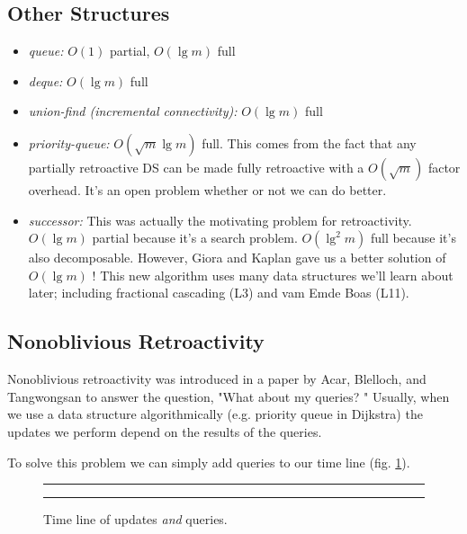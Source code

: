 \documentclass[11pt]{article}
\begin{document}
\subsection{Other Structures}
\begin{itemize}
\item{\emph{queue:}} $O(1)$ partial, $O(\lg m)$ full
\item{\emph{deque:}} $O(\lg m)$ full
\item{\emph{union-find (incremental connectivity):}} $O(\lg m)$ full
\item{\emph{priority-queue:}} $O(\sqrt{m}\lg m)$ full. This comes from the fact that any partially retroactive DS can be made fully retroactive with a $O(\sqrt{m})$ factor overhead.  It's an open problem whether or not we can do better.
\item{\emph{successor:}} This was actually the motivating problem for retroactivity.  $O(\lg m)$ partial because it's a search problem. $O(\lg^2 m)$ full because it's also decomposable.  However, Giora and Kaplan gave us a better solution of $O(\lg m)$ \cite{gk}!  This new algorithm uses many data structures we'll learn about later; including fractional cascading (L3) and vam Emde Boas (L11).

\end{itemize}

\subsection{Nonoblivious Retroactivity}

Nonoblivious retroactivity was introduced in a paper by Acar, Blelloch, and Tangwongsan to answer the question, "What about my queries? \cite{abt}"  Usually, when we use a data structure algorithmically (e.g. priority queue in Dijkstra) the updates we perform depend on the results of the queries.

To solve this problem we can simply add queries to our time line (fig. \ref{fig-nrtl}).

\begin{figure}[ht]
	\rule{\textwidth}{0.005in}
  \begin{center}
  \end{center}

  \caption{\small Time line of updates \emph{and} queries.}
  \label{fig-nrtl}
	\rule{\textwidth}{0.005in}
\end{figure}
\end{document}
